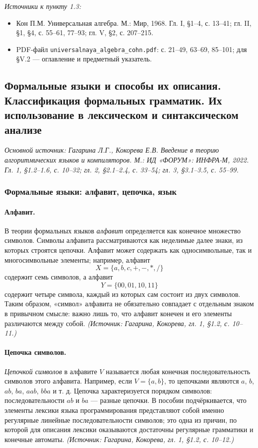 \documentclass[a4paper,12pt]{article}
\begin{document}
\noindent\textit{Источники к пункту 1.3:}
\begin{itemize}
\item Кон П.М. Универсальная алгебра. М.: Мир, 1968. Гл. I, §1--4, с. 13--41; гл. II, §1, §4, с. 55--61, 77--93; гл. V, §2, с. 207--215.
\item PDF-файл \texttt{universalnaya\_algebra\_cohn.pdf}: с. 21--49, 63--69, 85--101; для §V.2 — оглавление и предметный указатель.
\end{itemize}

\subsection{Формальные языки и способы их описания. Классификация формальных грамматик. Их использование в лексическом и синтаксическом анализе}

\noindent\textit{Основной источник: Гагарина Л.Г., Кокорева Е.В. Введение в теорию алгоритмических языков и компиляторов. М.: ИД «ФОРУМ»: ИНФРА-М, 2022. Гл. 1, §1.2--1.6, с. 10--32; гл. 2, §2.1--2.4, с. 33--54; гл. 3, §3.1--3.5, с. 55--99.}

\subsubsection{Формальные языки: алфавит, цепочка, язык}

\paragraph{Алфавит.}
В теории формальных языков \emph{алфавит} определяется как конечное множество символов. Символы алфавита рассматриваются как неделимые далее знаки, из которых строятся цепочки. Алфавит может содержать как односимвольные, так и многосимвольные элементы; например, алфавит
\[
X=\{a,b,c,+, -,*,/\}
\]
содержит семь символов, а алфавит
\[
Y=\{00,01,10,11\}
\]
содержит четыре символа, каждый из которых сам состоит из двух символов. Таким образом, «символ» алфавита не обязательно совпадает с отдельным знаком в привычном смысле: важно лишь то, что алфавит конечен и его элементы различаются между собой.
\textit{(Источник: Гагарина, Кокорева, гл. 1, §1.2, с. 10--11.)}

\paragraph{Цепочка символов.}
\emph{Цепочкой символов} в алфавите \(V\) называется любая конечная последовательность символов этого алфавита. Например, если \(V=\{a,b\}\), то цепочками являются \(a\), \(b\), \(ab\), \(ba\), \(aab\), \(bba\) и т. д. Цепочка характеризуется порядком символов: последовательности \(ab\) и \(ba\) — разные цепочки. В пособии подчёркивается, что элементы лексики языка программирования представляют собой именно регулярные линейные последовательности символов; это одна из причин, по которой для описания лексики оказываются достаточны регулярные грамматики и конечные автоматы.
\textit{(Источник: Гагарина, Кокорева, гл. 1, §1.2, с. 10--12.)}
\end{document}
